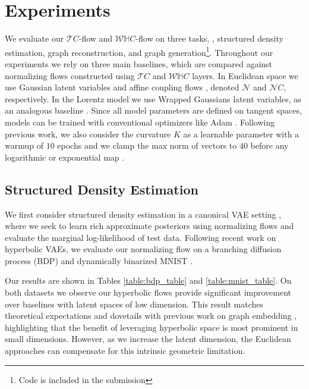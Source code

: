 \section{Experiments}
We evaluate our $\mathcal{T}C$-flow and $\mathcal{W}\mathbb{H}C$-flow on three tasks, \ie, structured density estimation, graph reconstruction, and graph generation\footnote{Code is included in the submission}. Throughout our experiments we rely on three main baselines, which are compared against normalizing flows constructed using $\mathcal{T}C$ and $\mathcal{W}\mathbb{H}C$ layers. In Euclidean space we use Gaussian latent variables and affine coupling flows \cite{dinh2016density}, denoted $\mathcal{N}$ and $\mathcal{N}C$, respectively. In the Lorentz model we use Wrapped Gaussians latent variables, as an analogous baseline \cite{nagano2019wrapped}. Since all model parameters are defined on tangent spaces, models can be trained with conventional optimizers like Adam \cite{kingma2014adam}. Following previous work, we also consider the curvature $K$ as a learnable parameter with a warmup of $10$ epochs and we clamp the max norm of vectors to $40$ before any logarithmic or exponential map \cite{skopek2019mixed}.

\subsection{Structured Density Estimation}
We first consider structured density estimation in a canonical VAE setting \cite{kingma2013auto}, where we seek to learn rich approximate posteriors using normalizing flows and evaluate the marginal log-likelihood of test data. Following recent work on hyperbolic VAEs, we evaluate our normalizing flow on a branching diffusion process (BDP) and dynamically binarized MNIST \cite{mathieu2019continuous,skopek2019mixed}. 

Our results are shown in Tables \ref{table:bdp_table} and \ref{table:mnist_table}.
On both datasets we observe our hyperbolic flows provide significant improvement over baselines with latent spaces of low dimension.
This result matches theoretical expectations and dovetails with previous work on graph embedding \cite{nickel2017poincare}, highlighting that the benefit of leveraging hyperbolic space is most prominent in small dimensions. However, as we increase the latent dimension, the Euclidean approaches can compensate for this intrinsic geometric limitation.  

